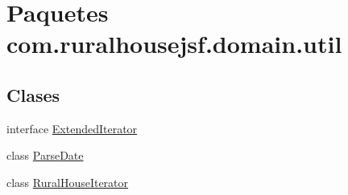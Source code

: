 \hypertarget{a00117}{}\section{Paquetes com.\+ruralhousejsf.\+domain.\+util}
\label{a00117}
\subsection*{Clases}
\begin{DoxyCompactItemize}
\item 
interface \mbox{\hyperlink{a00192}{Extended\+Iterator}}
\item 
class \mbox{\hyperlink{a00196}{Parse\+Date}}
\item 
class \mbox{\hyperlink{a00200}{Rural\+House\+Iterator}}
\end{DoxyCompactItemize}
